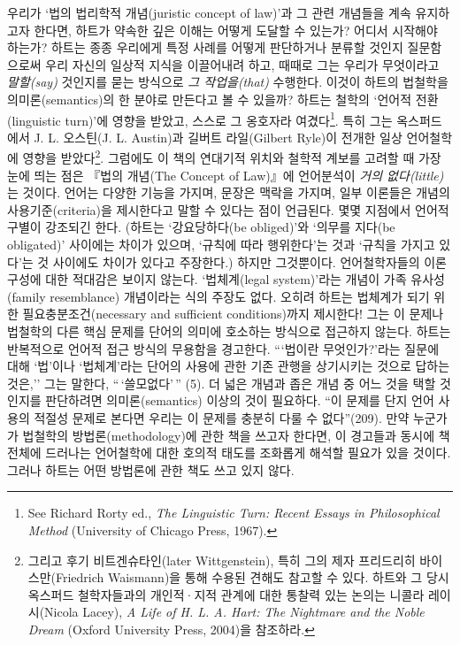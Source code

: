 \documentclass[12pt, oneside]{book}  %
\begin{document}
우리가 `법의 법리학적 개념(juristic concept of law)'과 그 관련 개념들을
계속 유지하고자 한다면, 하트가 약속한 깊은 이해는 어떻게 도달할 수
있는가? 어디서 시작해야 하는가? 하트는 종종 우리에게 특정 사례를 어떻게
판단하거나 분류할 것인지 질문함으로써 우리 자신의 일상적 지식을
이끌어내려 하고, 때때로 그는 우리가 무엇이라고 \emph{말할(say)} 것인지를
묻는 방식으로 \emph{그 작업을(that)} 수행한다. 이것이 하트의 법철학을
의미론(semantics)의 한 분야로 만든다고 볼 수 있을까? 하트는 철학의
`언어적 전환(linguistic turn)'에 영향을 받았고, 스스로 그 옹호자라
여겼다\footnote{See Richard Rorty ed., \emph{The Linguistic Turn: Recent
  Essays in Philosophical Method} (University of Chicago Press, 1967).}.
특히 그는 옥스퍼드에서 J. L. 오스틴(J. L. Austin)과 길버트 라일(Gilbert
Ryle)이 전개한 일상 언어철학에 영향을 받았다\footnote{그리고 후기
  비트겐슈타인(later Wittgenstein), 특히 그의 제자 프리드리히
  바이스만(Friedrich Waismann)을 통해 수용된 견해도 참고할 수 있다.
  하트와 그 당시 옥스퍼드 철학자들과의 개인적·지적 관계에 대한 통찰력
  있는 논의는 니콜라 레이시(Nicola Lacey), \emph{A Life of H. L. A.
  Hart: The Nightmare and the Noble Dream} (Oxford University Press,
  2004)을 참조하라.}. 그럼에도 이 책의 연대기적 위치와 철학적 계보를
고려할 때 가장 눈에 띄는 점은 『법의 개념(The Concept of Law)』에
언어분석이 \emph{거의 없다(little)}는 것이다. 언어는 다양한 기능을
가지며, 문장은 맥락을 가지며, 일부 이론들은 개념의 사용기준(criteria)을
제시한다고 말할 수 있다는 점이 언급된다. 몇몇 지점에서 언어적 구별이
강조되긴 한다. (하트는 `강요당하다(be obliged)'와 `의무를 지다(be
obligated)' 사이에는 차이가 있으며, `규칙에 따라 행위한다'는 것과
`규칙을 가지고 있다'는 것 사이에도 차이가 있다고 주장한다.) 하지만
그것뿐이다. 언어철학자들의 이론 구성에 대한 적대감은 보이지 않는다.
`법체계(legal system)'라는 개념이 가족 유사성(family resemblance)
개념이라는 식의 주장도 없다. 오히려 하트는 법체계가 되기 위한
필요충분조건(necessary and sufficient conditions)까지 제시한다! 그는 이
문제나 법철학의 다른 핵심 문제를 단어의 의미에 호소하는 방식으로
접근하지 않는다. 하트는 반복적으로 언어적 접근 방식의 무용함을 경고한다.
```법이란 무엇인가?'라는 질문에 대해 `법'이나 `법체계'라는 단어의 사용에
관한 기존 관행을 상기시키는 것으로 답하는 것은,'' 그는 말한다,
``\,`쓸모없다'\,'' (5). 더 넓은 개념과 좁은 개념 중 어느 것을 택할
것인지를 판단하려면 의미론(semantics) 이상의 것이 필요하다. ``이 문제를
단지 언어 사용의 적절성 문제로 본다면 우리는 이 문제를 충분히 다룰 수
없다''(209). 만약 누군가가 법철학의 방법론(methodology)에 관한 책을
쓰고자 한다면, 이 경고들과 동시에 책 전체에 드러나는 언어철학에 대한
호의적 태도를 조화롭게 해석할 필요가 있을 것이다. 그러나 하트는 어떤
방법론에 관한 책도 쓰고 있지 않다.
\end{document}
